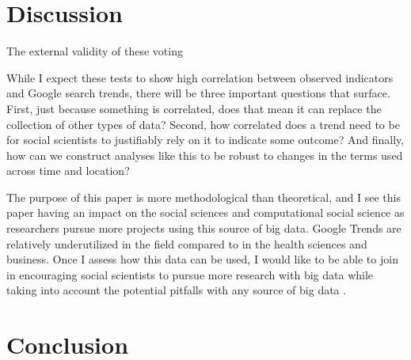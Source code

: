


\section{Discussion}

The external validity of these voting 


While I expect these tests to show high correlation between observed
indicators and Google search trends, there will be three important
questions that surface. First, just because something is correlated,
does that mean it can replace the collection of other types of data?
Second, how correlated does a trend need to be for social scientists to
justifiably rely on it to indicate some outcome? And finally, how can we
construct analyses like this to be robust to changes in the terms used
across time and location?

The purpose of this paper is more methodological than theoretical, and I
see this paper having an impact on the social sciences and computational
social science as researchers pursue more projects using this source of
big data. Google Trends are relatively underutilized in the field
compared to in the health sciences and business. Once I assess how this
data can be used, I would like to be able to join
\citet{bailCulturalEnvironmentMeasuring2014} in encouraging social scientists
to pursue more research with big data while taking into account the
potential pitfalls with any source of big data
\citep{mcfarlandBigDataDanger2015}.

\section{Conclusion}